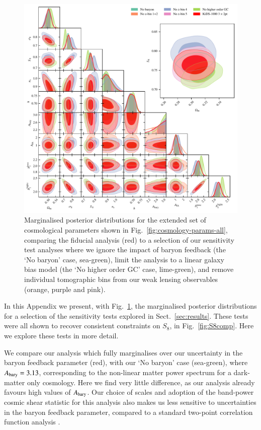 \begin{appendix}
\begin{figure}
	\begin{center}
		\includegraphics[width=\textwidth]{Parameter_Plots/systematics/blind_C_EE_nE_w_systematics_chains}
		\caption{Marginalised posterior distributions for the extended set of cosmological parameters shown in Fig.~\ref{fig:cosmology-params-all}, comparing the fiducial \tttp analysis (red) to a selection of our sensitivity test analyses where we ignore the impact of baryon feedback (the `No baryon' case, sea-green), limit the analysis to a linear galaxy bias model (the `No higher order GC' case, lime-green), and remove individual tomographic bins from our weak lensing observables (orange, purple and pink).}
		\label{fig:sensitivity_tests}
	\end{center}
\end{figure}

In this Appendix we present, with Fig.~\ref{fig:sensitivity_tests}, the marginalised posterior distributions for a selection of the \tttp sensitivity tests explored in Sect.~\ref{sec:results}.  
These tests were all shown to recover consistent constraints on $S_8$, in Fig.~\ref{fig:S8comp}.  Here we explore these tests in more detail.    

We compare our analysis which fully marginalises over our uncertainty in the baryon feedback parameter (red), with our `No baryon' case (sea-green), where $A_{\rm bary}=3.13$, corresponding to the non-linear matter power spectrum for a dark-matter only cosmology.   
Here we find very little difference, as our \tttp analysis already favours high values of $A_{\rm bary}$.   
Our choice of scales and adoption of the band-power cosmic shear statistic for this analysis also makes us less sensitive to uncertainties in the baryon feedback parameter, compared to a standard two-point correlation function analysis \citep{asgari/etal:2020_KD}.


\end{appendix}
